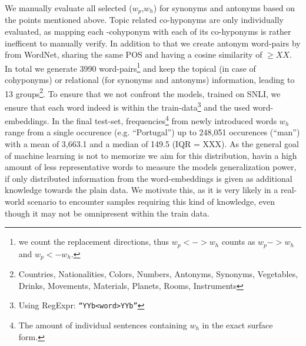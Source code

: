 We manually evaluate all selected ($w_p$,$w_h$) for synonyms and antonyms based on the points mentioned above. Topic related co-hyponyms are only individually evaluated, as mapping each -cohyponym with each of its co-hyponyms is rather inefficent to manually verify. In addition to that we create antonym word-pairs by from WordNet, sharing the same \ac{POS} and having a cosine similarity of $\geq XX$. In total we generate 3990 word-pairs\footnote{we count the replacement directions, thus $w_p <-> w_h$ counts as $w_p -> w_h$ and $w_p <- w_h$.} and keep the topical (in case of cohyponyms) or relational (for synonyms and antonyms) information, leading to 13 groups\footnote{Countries, Nationalities, Colors, Numbers, Antonyms, Synonyms, Vegetables, Drinks, Movements, Materials, Planets, Rooms, Instruments}. To ensure that we not confront the models, trained on \ac{SNLI}, we ensure that each word indeed is within the train-data\footnote{Using RegExpr: \texttt{``YYb<word>YYb''}} and the used word-embeddings. In the final test-set, frequencies\footnote{The amount of individual sentences containing $w_h$ in the exact surface form.} from newly introduced words $w_h$ range from a single occurence (e.g. ``Portugal'') up to 248,051 occurences (``man'') with a mean of 3,663.1 and a median of 149.5 (IQR = XXX). As the general goal of machine learning is not to memorize we aim for this distribution, havin a high amount of less representative words to measure the models generalization power, if only distributed information from the word-embeddings is given as additional knowledge towards the plain data. We motivate this, as it is very likely in a real-world scenario to encounter samples requiring this kind of knowledge, even though it may not be omnipresent within the train data.

